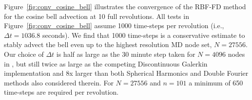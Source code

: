 \documentclass{report}
\begin{document}
Figure~\ref{fig:conv_cosine_bell} illustrates the convergence of the RBF-FD method for the cosine bell advection at 10 full revolutions. All tests in Figure~\ref{fig:conv_cosine_bell} assume 1000 time-steps per revolution (i.e., $\Delta t = 1036.8$ seconds). We find that 1000 time-steps is a conservative estimate to stably advect the bell even up to the highest resolution MD node set, $N=27556$. Our choice of $\Delta t$ is half as large as the 30 minute step taken for $N=4096$ nodes in \cite{FlyerWright07}, but still twice as large as the competing Discontinuous Galerkin implementation and 8x larger than both Spherical Harmonics and Double Fourier methods also considered therein. For $N=27556$ and $n=101$ a minimum of 650 time-steps are required per revolution. 




%




\ifstandalone


\end{document}

